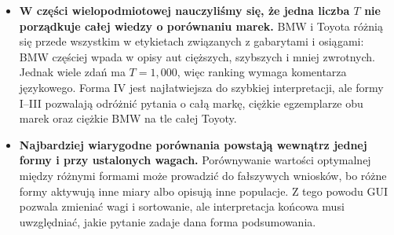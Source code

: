 \documentclass{article}
\begin{document}
\begin{itemize}
    \item \textbf{W części wielopodmiotowej nauczyliśmy się, że jedna liczba
    $T$ nie porządkuje całej wiedzy o porównaniu marek.} BMW i Toyota różnią
    się przede wszystkim w etykietach związanych z gabarytami i osiągami:
    BMW częściej wpada w opisy aut cięższych, szybszych i mniej zwrotnych.
    Jednak wiele zdań ma $T=1{,}000$, więc ranking wymaga komentarza
    językowego. Forma IV jest najłatwiejsza do szybkiej interpretacji, ale
    formy I--III pozwalają odróżnić pytania o całą markę, ciężkie egzemplarze
    obu marek oraz ciężkie BMW na tle całej Toyoty.

    \item \textbf{Najbardziej wiarygodne porównania powstają wewnątrz jednej
    formy i przy ustalonych wagach.} Porównywanie wartości optymalnej między
    różnymi formami może prowadzić do fałszywych wniosków, bo różne formy
    aktywują inne miary albo opisują inne populacje. Z tego powodu GUI
    pozwala zmieniać wagi i sortowanie, ale interpretacja końcowa musi
    uwzględniać, jakie pytanie zadaje dana forma podsumowania.
\end{itemize}
\end{document}
